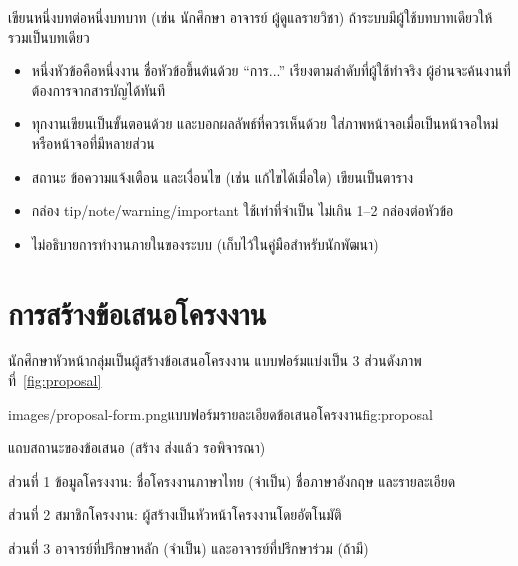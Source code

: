 \label{ch:student}

\begin{guide}
เขียนหนึ่งบทต่อหนึ่งบทบาท (เช่น นักศึกษา อาจารย์ ผู้ดูแลรายวิชา) ถ้าระบบมีผู้ใช้บทบาทเดียวให้รวมเป็นบทเดียว
\begin{itemize}
  \item หนึ่งหัวข้อคือหนึ่งงาน ชื่อหัวข้อขึ้นต้นด้วย ``การ...'' เรียงตามลำดับที่ผู้ใช้ทำจริง
        ผู้อ่านจะค้นงานที่ต้องการจากสารบัญได้ทันที
  \item ทุกงานเขียนเป็นขั้นตอนด้วย  และบอกผลลัพธ์ที่ควรเห็นด้วย \cmd{\result}
        ใส่ภาพหน้าจอเมื่อเป็นหน้าจอใหม่หรือหน้าจอที่มีหลายส่วน
  \item สถานะ ข้อความแจ้งเตือน และเงื่อนไข (เช่น แก้ไขได้เมื่อใด) เขียนเป็นตาราง
  \item กล่อง tip/note/warning/important ใช้เท่าที่จำเป็น ไม่เกิน 1--2 กล่องต่อหัวข้อ
  \item ไม่อธิบายการทำงานภายในของระบบ (เก็บไว้ในคู่มือสำหรับนักพัฒนา)
\end{itemize}
\end{guide}

\section{การสร้างข้อเสนอโครงงาน}
\label{sec:proposal}

นักศึกษาหัวหน้ากลุ่มเป็นผู้สร้างข้อเสนอโครงงาน แบบฟอร์มแบ่งเป็น 3 ส่วนดังภาพที่~\ref{fig:proposal}

\begin{screenshot}[width=0.5\linewidth]{images/proposal-form.png}{แบบฟอร์มรายละเอียดข้อเสนอโครงงาน}{fig:proposal}
\end{screenshot}

\begin{calloutlist}
  \item แถบสถานะของข้อเสนอ (สร้าง ส่งแล้ว รอพิจารณา)
  \item ส่วนที่ 1 ข้อมูลโครงงาน: ชื่อโครงงานภาษาไทย (จำเป็น) ชื่อภาษาอังกฤษ และรายละเอียด
  \item ส่วนที่ 2 สมาชิกโครงงาน: ผู้สร้างเป็นหัวหน้าโครงงานโดยอัตโนมัติ
  \item ส่วนที่ 3 อาจารย์ที่ปรึกษาหลัก (จำเป็น) และอาจารย์ที่ปรึกษาร่วม (ถ้ามี)
\end{calloutlist}

